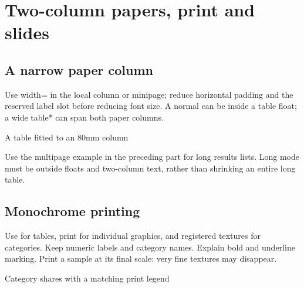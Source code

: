 
\section{Two-column papers, print and slides}
\subsection{A narrow paper column}
Use width=\key{\linewidth} in the local column or minipage; reduce horizontal
padding and the reserved label slot before reducing font size. A normal 
can be inside a table float; a wide table* can span both paper columns.
\begin{demo}{A table fitted to an 80mm column}
\begin{minipage}{80mm}
\begin{center}
\begin{gradtable}[align=c,header align=c,width=\linewidth,preset=paper,label width=8mm,column sep=3pt,min text width=12mm,
  min graphic width=15mm]
\end{gradtable}
\end{center}
\end{minipage}
\end{demo}
Use the multipage example in the preceding part for long results lists. Long mode
must be outside floats and two-column text, rather than shrinking an entire long table.

\subsection{Monochrome printing}
Use  for tables, print for individual graphics, and registered textures
for categories. Keep numeric labels and category names. Explain bold and underline
marking. Print a sample at its final scale: very fine textures may disappear.
\begin{demo}{Category shares with a matching print legend}
\end{demo}

